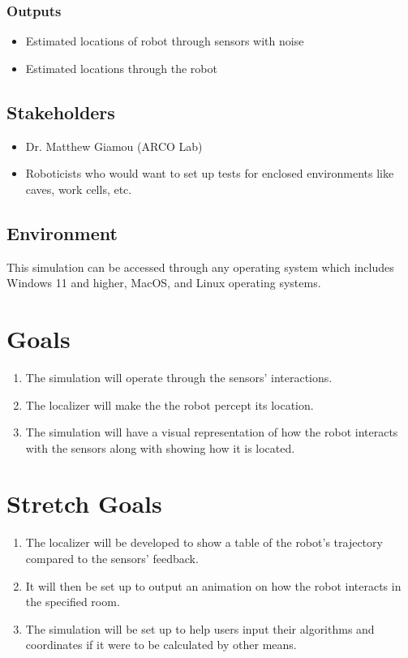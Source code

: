 \documentclass{article}
\begin{document}
\subsubsection{Outputs}
\begin{itemize}
    \item Estimated locations of robot through sensors with noise
    \item Estimated locations through the robot  
\end{itemize}

\subsection{Stakeholders}
\begin{itemize}
    \item Dr. Matthew Giamou (ARCO Lab)
    \item Roboticists who would want to set up tests for enclosed environments like caves, work cells, etc.
\end{itemize}

\subsection{Environment}
This simulation can be accessed through any operating system which includes Windows 11 and higher, MacOS, and Linux operating systems.

\section{Goals}
\begin{enumerate}
    \item The simulation will operate through the sensors' interactions.
    \item The localizer will make the the robot percept its location.
    \item The simulation will have a visual representation of how the robot interacts with the sensors along with showing how it is located.
\end{enumerate} 

\section{Stretch Goals}
\begin{enumerate}           
    \item The localizer will be developed to show a table of the robot's trajectory compared to the sensors' feedback.
    \item It will then be set up to output an animation on how the robot interacts in the specified room.
    \item The simulation will be set up to help users input their algorithms and coordinates if it were to be calculated by other means.
\end{enumerate}
\end{document}
